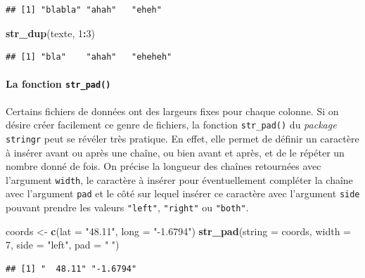 \documentclass[
  11pt,
]{book}
\newenvironment{Shaded}{\begin{snugshade}}{\end{snugshade}}
\newcommand{\DataTypeTok}[1]{\textcolor[rgb]{0.13,0.29,0.53}{#1}}
\newcommand{\DecValTok}[1]{\textcolor[rgb]{0.00,0.00,0.81}{#1}}
\newcommand{\KeywordTok}[1]{\textcolor[rgb]{0.13,0.29,0.53}{\textbf{#1}}}
\newcommand{\NormalTok}[1]{#1}
\newcommand{\OperatorTok}[1]{\textcolor[rgb]{0.81,0.36,0.00}{\textbf{#1}}}
\newcommand{\StringTok}[1]{\textcolor[rgb]{0.31,0.60,0.02}{#1}}
\numberwithin{equation}{section}
\numberwithin{countremarque}{section}
\begin{document}
\begin{lstlisting}
## [1] "blabla" "ahah"   "eheh"
\end{lstlisting}

\begin{Shaded}
\begin{Highlighting}[]
\KeywordTok{str\_dup}\NormalTok{(texte, }\DecValTok{1}\OperatorTok{:}\DecValTok{3}\NormalTok{)}
\end{Highlighting}
\end{Shaded}

\begin{lstlisting}
## [1] "bla"    "ahah"   "eheheh"
\end{lstlisting}

\hypertarget{la-fonction-str_pad}{%
\paragraph{\texorpdfstring{La fonction \texttt{str\_pad()}}{La fonction str\_pad()}}\label{la-fonction-str_pad}}

Certains fichiers de données ont des largeurs fixes pour chaque colonne. Si on désire créer facilement ce genre de fichiers, la fonction \texttt{str\_pad()} du \emph{package} \texttt{stringr} peut se révéler très pratique. En effet, elle permet de définir un caractère à insérer avant ou après une chaîne, ou bien avant et après, et de le répéter un nombre donné de fois. On précise la longueur des chaînes retournées avec l'argument \texttt{width}, le caractère à insérer pour éventuellement compléter la chaîne avec l'argument \texttt{pad} et le côté sur lequel insérer ce caractère avec l'argument \texttt{side} pouvant prendre les valeurs \texttt{"left"}, \texttt{"right"} ou \texttt{"both"}.

\begin{Shaded}
\begin{Highlighting}[]
\NormalTok{coords \textless{}{-}}\StringTok{ }\KeywordTok{c}\NormalTok{(}\DataTypeTok{lat =} \StringTok{"48.11"}\NormalTok{, }\DataTypeTok{long =} \StringTok{"{-}1.6794"}\NormalTok{)}
\KeywordTok{str\_pad}\NormalTok{(}\DataTypeTok{string =}\NormalTok{ coords, }\DataTypeTok{width =} \DecValTok{7}\NormalTok{, }\DataTypeTok{side =} \StringTok{"left"}\NormalTok{, }\DataTypeTok{pad =} \StringTok{" "}\NormalTok{)}
\end{Highlighting}
\end{Shaded}

\begin{lstlisting}
## [1] "  48.11" "-1.6794"
\end{lstlisting}
\end{document}
